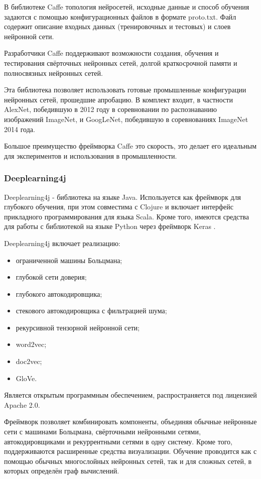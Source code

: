 В библиотеке Caffe топология нейросетей, исходные данные и способ обучения задаются с помощью конфигурационных файлов в формате proto.txt. Файл содержит описание входных данных (тренировочных и тестовых) и слоев нейронной сети.

Разработчики Caffe поддерживают возможности создания, обучения и тестирования свёрточных нейронных сетей, долгой краткосрочной памяти и полносвязных нейронных сетей.

Эта библиотека позволяет использовать готовые промышленные конфигурации нейронных сетей, прошедшие апробацию. В комплект входит, в частности AlexNet, победившую в 2012 году в соревновании по распознаванию изображений ImageNet, и GoogLeNet, победившую в соревнованиях ImageNet 2014 года.

Большое преимущество фреймворка Caffe это скорость, это делает его идеальным для экспериментов и использования в промышленности. 



\subsubsection{Deeplearning4j}

Deeplearning4j - библиотека на языке Java. Используется как фреймворк для глубокого обучения, при этом совместима с Clojure и включает интерфейс прикладного программирования для языка Scala. Кроме того, имеются средства для работы с библиотекой на языке Python через фреймворк Keras \cite{deeplearning4j_doc} .

Deeplearning4j включает реализацию:
\begin{itemize}
\item ограниченной машины Больцмана;
\item глубокой сети доверия;
\item глубокого автокодировщика;
\item стекового автокодировщика с фильтрацией шума;
\item рекурсивной тензорной нейронной сети;
\item word2vec;
\item doc2vec;
\item GloVe.
\end{itemize}


Является открытым программным обеспечением, распространяется под лицензией Apache 2.0.

Фреймворк позволяет комбинировать компоненты, объединяя обычные нейронные сети с машинами Больцмана, свёрточными нейронными сетями, автокодировщиками и рекуррентными сетями в одну систему. Кроме того, поддерживаются расширенные средства визуализации. Обучение проводится как с помощью обычных многослойных нейронных сетей, так и для сложных сетей, в которых определён граф вычислений.



